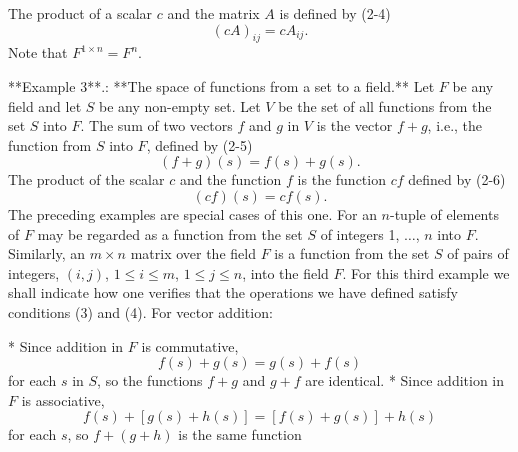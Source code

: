 The product of a scalar \(c\) and the matrix \(A\) is defined by (2-4) \[(cA)_{ij}=cA_{ij}.\] Note that \(F^{1\times n}=F^{n}\).

**Example 3**.: **The space of functions from a set to a field.** Let \(F\) be any field and let \(S\) be any non-empty set. Let \(V\) be the set of all functions from the set \(S\) into \(F\). The sum of two vectors \(f\) and \(g\) in \(V\) is the vector \(f+g\), i.e., the function from \(S\) into \(F\), defined by (2-5) \[(f+g)(s)=f(s)+g(s).\] The product of the scalar \(c\) and the function \(f\) is the function \(cf\) defined by (2-6) \[(cf)(s)=cf(s).\] The preceding examples are special cases of this one. For an \(n\)-tuple of elements of \(F\) may be regarded as a function from the set \(S\) of integers 1, \(\ldots\), \(n\) into \(F\). Similarly, an \(m\times n\) matrix over the field \(F\) is a function from the set \(S\) of pairs of integers, \((i,j)\), \(1\leq i\leq m\), \(1\leq j\leq n\), into the field \(F\). For this third example we shall indicate how one verifies that the operations we have defined satisfy conditions (3) and (4). For vector addition:

* Since addition in \(F\) is commutative, \[f(s)+g(s)=g(s)+f(s)\] for each \(s\) in \(S\), so the functions \(f+g\) and \(g+f\) are identical.
* Since addition in \(F\) is associative, \[f(s)+[g(s)+h(s)]=[f(s)+g(s)]+h(s)\] for each \(s\), so \(f+(g+h)\) is the same function
 
